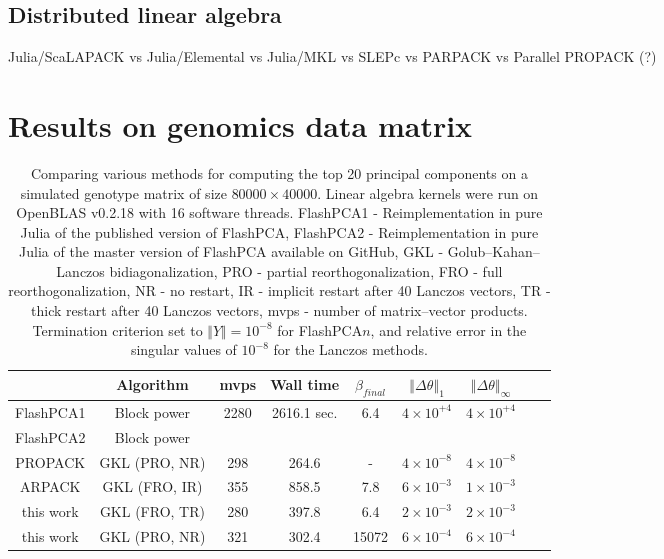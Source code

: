 \documentclass[final,leqno]{siamltex1213}
\begin{document}
\subsection{Distributed linear algebra}



Julia/ScaLAPACK vs Julia/Elemental vs Julia/MKL vs SLEPc vs PARPACK vs Parallel PROPACK (?)




\section{Results on genomics data matrix}

\begin{table}
\begin{tabular}{|c|c|c|c|c|c|c|c|c|}
\hline
 & Algorithm & mvps & Wall time & $\beta_{final}$ & $\left\Vert \Delta\theta\right\Vert _{1}$ & $\left\Vert \Delta\theta\right\Vert _{\infty}$\tabularnewline
\hline
\hline
FlashPCA1 & Block power & 2280 & 2616.1 sec. & 6.4 & $4\times10^{+4}$ & $4\times10^{+4}$\tabularnewline
\hline
FlashPCA2 & Block power &  &  &  &  & \tabularnewline
\hline
PROPACK & GKL (PRO, NR) & 298 & 264.6 & - & $4\times10^{-8}$ & $4\times10^{-8}$\tabularnewline
\hline
ARPACK & GKL (FRO, IR) & 355 & 858.5 & 7.8 & $6\times10^{-3}$ & $1\times10^{-3}$\tabularnewline
\hline
this work & GKL (FRO, TR) & 280 & 397.8 & 6.4 & $2\times10^{-3}$ & $2\times10^{-3}$\tabularnewline
\hline
this work & GKL (PRO, NR) & 321 & 302.4 & 15072 & $6\times10^{-4}$ & $6\times10^{-4}$\tabularnewline
\hline
\end{tabular}

\caption{Comparing various methods for computing the top 20 principal
components on a simulated genotype matrix of size $80000\times40000$.
Linear algebra kernels were run on OpenBLAS v0.2.18 with 16 software threads.
FlashPCA1 - Reimplementation in pure Julia of the published version of FlashPCA,
FlashPCA2 - Reimplementation in pure Julia of the master version of FlashPCA available on GitHub,
GKL - Golub--Kahan--Lanczos bidiagonalization,
PRO - partial reorthogonalization,
FRO - full reorthogonalization,
NR - no restart,
IR - implicit restart after 40 Lanczos vectors,
TR - thick restart after 40 Lanczos vectors,
mvps - number of matrix--vector products.
Termination criterion set to $\Vert Y\Vert = 10^{-8}$ for FlashPCA$n$,
and relative error in the singular values of $10^{-8}$ for the Lanczos methods.
}
\end{table}
\end{document}

